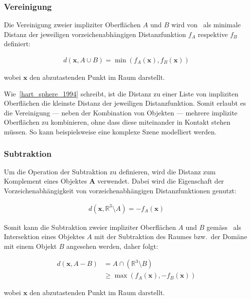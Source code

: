 \subsubsection{Vereinigung}
\label{ssubsec:implicit_surfaces_ops_union}

Die Vereinigung zweier impliziter Oberflächen $A$ und $B$ wird
von~\cite{hart_sphere_1994} als minimale Distanz der jeweiligen
vorzeichenabhängigen  Distanzfunktion $f_{A}$ respektive $f_{B}$ definiert:

\begin{gather}
    d(\bm{x}, A \cup B) = \min(f_{A}(\bm{x}), f_{B}(\bm{x}))
\end{gather}

wobei $\bm{x}$ den abzutastenden Punkt im Raum darstellt.

Wie~\ref{hart_sphere_1994} schreibt, ist die Distanz zu einer Liste von
impliziten Oberflächen die kleinste Distanz der jeweiligen Distanzfunktion.
Somit erlaubt es die Vereinigung --- neben der Kombination von Objekten ---
mehrere implizite Oberflächen zu kombinieren, ohne dass diese miteinander in
Kontakt stehen müssen. So kann beispielsweise eine komplexe Szene modelliert
werden.

\subsubsection{Subtraktion}
\label{ssubsec:implicit_surfaces_ops_subtraction}

Um die Operation der Subtraktion zu definieren, wird die Distanz zum Komplement
eines Objektes $\bm{A}$ verwendet. Dabei wird die Eigenschaft der
Vorzeichenabhängigkeit von vorzeichenabhängigen Distanzfunktionen genutzt:

\begin{gather}
    d(\bm{x}, \mathbb{R}^{3} \setminus A) = -f_{A}(\bm{x})
\end{gather}

Somit kann die Subtraktion zweier impliziter Oberflächen $A$ und $B$
gemäss~\cite{hart_sphere_1994} als Intersektion eines Objektes $A$ mit der
Subtraktion des Raumes bzw.\ der Domäne mit einem Objekt $B$ angesehen werden,
daher folgt:

\begin{align}
    d(\bm{x}, A - B) &= A \cap (\mathbb{R}^{3} \setminus B) \\
                     &\geq \max(f_{A}(\bm{x}), -f_{B}(\bm{x}))
\end{align}

wobei $\bm{x}$ den abzutastenden Punkt im Raum darstellt.

